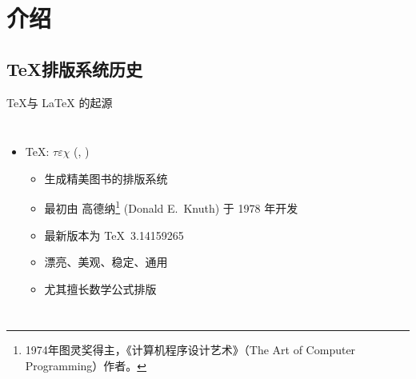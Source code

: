 

\section{介绍}

\subsection{\TeX 排版系统历史}

\begin{frame}[fragile]{\TeX 与 \LaTeX{} 的起源}
  \begin{columns}[T]
    \begin{itemize}
      \item \TeX: $\tau\varepsilon\chi$ (,
        )
        \begin{itemize}
          \item 生成精美图书的排版系统
          \item 最初由 高德纳\footnote{1974年图灵奖得主，《计算机程序设计艺术》（The Art of Computer Programming）作者。} (Donald E.~Knuth) 于 1978 年开发  
          \item 最新版本为 \TeX\ 3.14159265
          \item 漂亮、美观、稳定、通用
          \item 尤其擅长数学公式排版
        \end{itemize}


\end{itemize}
\end{columns}
\end{frame}
